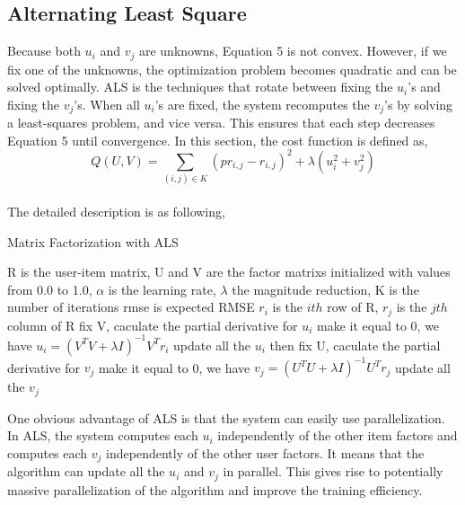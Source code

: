 \documentclass{sig-alternate-05-2015}
\begin{document}
\subsection{Alternating Least Square}
Because both $u_{i}$ and $v_{j}$ are unknowns, Equation 5 is not convex. However, if we fix one of the unknowns, the optimization problem becomes quadratic and can be solved optimally.
ALS is the techniques that rotate between fixing the  $u_{i}$'s and fixing the  $v_{j}$'s. When all  $u_{i}$'s are fixed, the system
recomputes the  $v_{j}$'s by solving a least-squares problem, and vice versa. This ensures that each step decreases Equation 5 until convergence. In this section, the cost function is defined as,\\
           \begin{equation}
     		Q(U, V)= {\sum\limits_{(i,j) \in K} {(pr_{i,j} - r_{i,j})}^{2} + \lambda(u_{i}^{2} + v_{j}^{2}) }
			\end{equation}
\\The detailed description is as following, \\
\begin{algorithm}
    \caption{Matrix Factorization with ALS}

    \begin{algorithmic}[2]
        \Require
            \Statex R is the user-item matrix,
            \Statex U and V are the factor matrixs initialized with values from 0.0 to 1.0,
            \Statex $\alpha$ is the learning rate,
            \Statex $\lambda$ the magnitude reduction,
            \Statex K is the number of iterations
            \Statex rmse is expected RMSE
            \Statex $r_i$ is the $ith$ row of R, $r_j$ is the $jth$ column of R
        \State fix V, caculate the partial derivative for $u_i$ 
        \State make it equal to 0, we have
        \State $u_i = (V^TV+ \lambda I)^{-1}V^Tr_i$
        \State update all the $u_i$
        \State then fix U, caculate the partial derivative for $v_j$
        \State make it equal to 0, we have
        \State $v_j = (U^TU+ \lambda I)^{-1}U^Tr_j$
        \State update all the $v_j$
    \EndFor
    \end{algorithmic}
\end{algorithm}

One obvious advantage of ALS is that the system can easily use parallelization. In ALS,
the system computes each $u_i$ independently of the other item factors and computes each $v_j$ independently of the other user factors.
It means that the algorithm can update all the $u_i$ and $v_j$ in parallel. This gives rise to potentially massive parallelization of the algorithm and improve the training efficiency.
\end{document}
